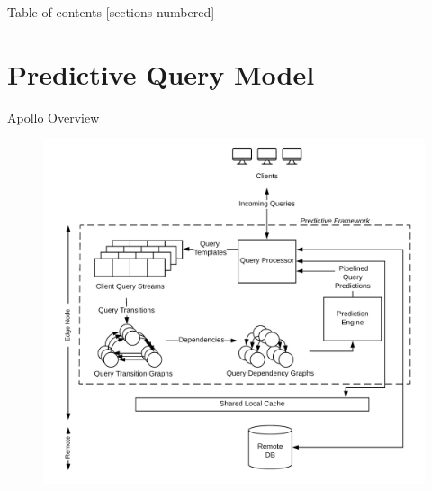 \documentclass[10pt]{beamer}
\begin{document}
\begin{frame}{Table of contents}
  [sections numbered]
  \tableofcontents[hideallsubsections]
\end{frame}

\section{Predictive Query Model}

\begin{frame}[fragile]{Apollo Overview}
    \begin{figure}
        \hspace*{-1cm}
        \includegraphics[scale=0.13]{apollo_overview}
    \end{figure}
\end{frame}
\end{document}

